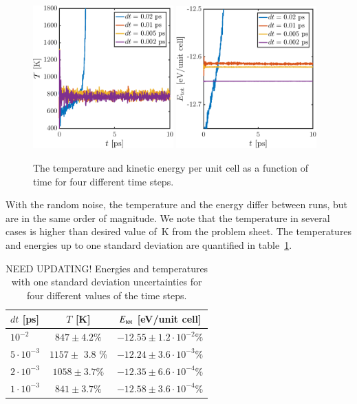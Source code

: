 \begin{figure}[!ht]
\begin{center}
  \includegraphics[width=0.48\textwidth]{../figures/dt-scan-temperature} 
    \includegraphics[width=0.48\textwidth]{../figures/dt-scan-energy} 
  \caption{The temperature and kinetic energy per unit cell as a function of time for four different time steps.}
  \label{fig:task2}
\end{center}
\end{figure}

With the random noise, the temperature and the energy differ between runs, but are in the same order of magnitude. 
We note that the temperature in several cases is higher than desired value of~\unit[600-800]{K} from the problem sheet. The temperatures and energies up to one standard deviation are quantified in table~\ref{tab:task2}.

\begin{table}[!ht]
  \begin{center}
    \caption{NEED UPDATING! Energies and temperatures with one standard deviation uncertainties for four different values of the time steps.}
    \begin{tabular}{l c c} 
    $dt$ [ps] & $T$ [K] & $E_{\rm tot}$ [eV/unit cell]\\ \hline
$10^{-2}$ & 	$847 \pm 4.2\%$ &	$-12.55 \pm 1.2\cdot 10^{-2} \% $\\
$5\cdot 10^{-3}$ &	$1157 \pm$ 3.8 \% &$-12.24 \pm 3.6\cdot 10^{-3} \%$ \\
$2\cdot 10^{-3}$ & $1058  \pm 3.7 \% $ & 	$ -12.35 \pm 6.6\cdot 10^{-4} \% $\\ 
$1\cdot 10^{-3}$ & $ 841  \pm 3.7 \% $	 &$ -12.58 \pm 3.6\cdot 10^{-4} \%$ \\ 
      \hline
    \end{tabular}
    \label{tab:task2}
  \end{center}
\end{table}


